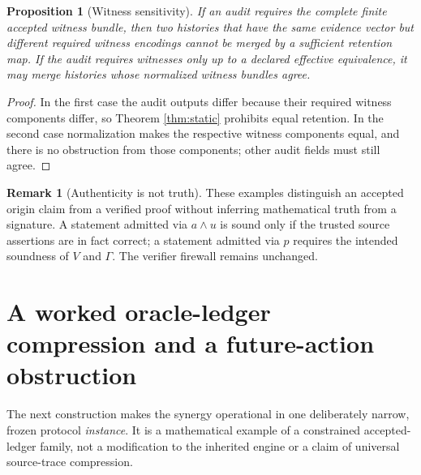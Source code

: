 \documentclass[11pt,letterpaper]{article}
\newtheorem{proposition}[theorem]{Proposition}
\theoremstyle{definition}
\newtheorem{remark}[theorem]{Remark}
\begin{document}
\begin{proposition}[Witness sensitivity]\label{prop:witness}
If an audit requires the complete finite accepted witness bundle, then two histories that have the same evidence vector but different required witness encodings cannot be merged by a sufficient retention map. If the audit requires witnesses only up to a declared effective equivalence, it may merge histories whose normalized witness bundles agree.
\end{proposition}
\begin{proof}
In the first case the audit outputs differ because their required witness components differ, so Theorem \ref{thm:static} prohibits equal retention. In the second case normalization makes the respective witness components equal, and there is no obstruction from those components; other audit fields must still agree.
\end{proof}

\begin{remark}[Authenticity is not truth]
These examples distinguish an accepted origin claim from a verified proof without inferring mathematical truth from a signature. A statement admitted via $a\land u$ is sound only if the trusted source assertions are in fact correct; a statement admitted via $p$ requires the intended soundness of $V$ and $\Gamma$. The verifier firewall remains unchanged.
\end{remark}


\section{A worked oracle-ledger compression and a future-action obstruction}\label{sec:worked}
The next construction makes the synergy operational in one deliberately narrow, frozen protocol \emph{instance}. It is a mathematical example of a constrained accepted-ledger family, not a modification to the inherited engine or a claim of universal source-trace compression.
\end{document}
